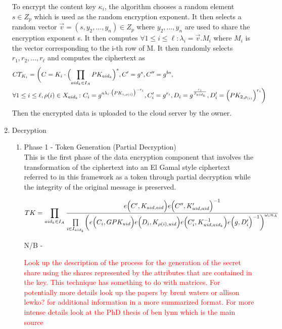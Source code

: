 \begin{enumerate}
	To encrypt the content key $\kappa_{i}$, the algorithm chooses a random element $ s \in Z_{p} $ which is used as the random encryption exponent. It then selects a random vector $ \vec{v} = (s, y_{2},\ldots,y_{n}) \in Z_{p} $ where $ y_{2},\ldots,y_{n} $ are used to share the encryption exponent s. It then computes $ \forall 1 \leq i \leq \ell: \lambda_{i} = \vec{v}.M_{i} $ where $ M_{i} $ is the vector corresponding to the i-th row of M. It then randomly selects $ r_{1},r_{2},\ldots,r_{\ell} $ and computes the ciphertext as	
	\begin{align*}
		&CT_{K_{i}} = \biggl(C = K_{i}\cdot\Bigl(\prod\limits_{aid_{k} \in I_{A}}PK_{aid_{k}}\Bigl)^{s}, C' = g^{s}, C'' = g^{bs},\\
		&\forall 1 \leq i \leq \ell, \rho(i) \in X_{aid_{k}} \colon C_{i} = g^{a\lambda_{i}\cdot\bigl(PK_{i,\rho(i)}\bigl)^{-r_{i}}}, C'_{i} = g^{r_{i}},D_{i} = g^{\frac{r_{i}}{\beta_{aid_k}}}, D'_{i} = \Bigl(PK_{2,\rho_{(i)}}\Bigl)^{r_{i}}\biggl)
	\end{align*}
	Then the encrypted data is uploaded to the cloud server by the owner.
	
	\item Decryption 
	
	\begin{enumerate}
		
		\item Phase 1 - Token Generation (Partial Decryption)\\
		This is the first phase of the data encryption component that involves the transformation of the ciphertext into an El Gamal style ciphertext referred to in this framework as a token through partial decryption while the integrity of the original message is preserved.
		
		\begin{align*}
			TK = \prod\limits_{aid_{k} \in I_{A}} \frac{e\Bigl(C', K_{uid,aid}\Bigl)e\Bigl(C'', K'_{uid,aid}\Bigl)^{-1}}{\prod\limits_{i \in I_{aid_k}}\biggl(e\Bigl(C_i, GPK_{uid}\Bigl)e\Bigl(D_i, K_{\rho(i),uid}\Bigl)e\Bigl(C'_i, K_{uid,aid_k}^{-1}\Bigl)e\Bigl(g, D'_i\Bigl)^{-1}\biggl)^{\omega_{i}n_A}}
		\end{align*}
	
		N/B - 
		
		\textcolor{red}{Look up the description of the process for the generation of the secret share using the shares represented by the attributes that are contained in the key. This technique has something to do with matrices. For potentially more details look up the papers by brent waters or allison lewko? for additional information in a more summarized format. For more intense details look at the PhD thesis of ben lynn which is the main source}
		

\end{enumerate}
\end{enumerate}
